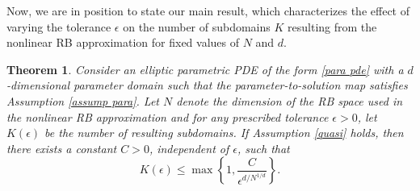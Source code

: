\documentclass[12pt]{article}
\newtheorem{theorem}{Theorem}[section]
\theoremstyle{remark}
\theoremstyle{definition}
\numberwithin{equation}{section}
\begin{document}
Now, we are in position to state our main result, which characterizes the effect of varying the tolerance $\epsilon$ on the number of subdomains $K$ resulting from the nonlinear RB approximation for fixed values of $N$ and $d$.
\begin{theorem} 
    Consider an elliptic parametric PDE of the form \eqref{para pde} with a $d$-dimensional parameter domain such that the parameter-to-solution map satisfies Assumption \ref{assump para}. 
    Let $N$ denote the dimension of the RB space used in the nonlinear RB approximation and for any prescribed tolerance $\epsilon>0$, let $K(\epsilon)$ be the number of resulting subdomains. If Assumption \ref{quasi} holds, then there exists a constant $C > 0$, independent of $\epsilon$, such that
    \begin{equation}
        K(\epsilon) \leq \max\left\{1, \frac{C}{\epsilon^{d/N^{1/d}}}\right\}.
    \end{equation}
    \label{th conv}
\end{theorem}
\end{document}
